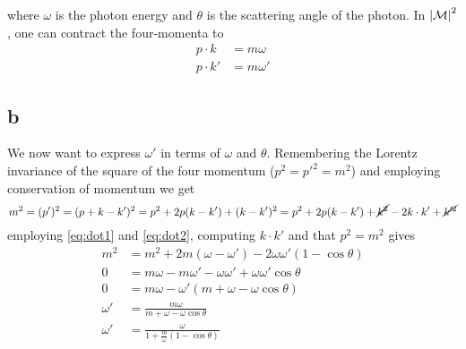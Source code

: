 \documentclass[11pt, a4paper]{amsart}
\begin{document}
where $\omega$ is the photon energy and $\theta$ is the scattering angle of the photon. In $\abs{\mathcal{M}}^2$, one can contract the four-momenta to
\begin{align}
p \cdot k \   &= m \omega \label{eq:dot1}\\
p \cdot k' &= m \omega' \label{eq:dot2}
\end{align}

\subsection{b}
We now want to express $\omega'$ in terms of $\omega$ and $\theta$. Remembering the Lorentz invariance of the square of the four momentum ($p^2 = p'^2 = m^2$) and employing conservation of momentum we get
\begin{equation}
m^2 = (p')^2 = (p + k - k')^2 = p^2 + 2p(k-k') + (k -k')^2 = p^2 + 2p(k-k') + \cancel{k^2} - 2k\cdot k' + \cancel{k'^2}
\end{equation}
employing \autoref{eq:dot1} and \autoref{eq:dot2}, computing $k\cdot k'$ and that $p^2 = m^2$ gives
\begin{align}
  m^2 &= m^2 + 2m(\omega - \omega') - 2\omega\omega'(1 - \cos \theta) \nonumber \\
       0 &= m\omega -m\omega' - \omega\omega' + \omega\omega'\cos \theta \nonumber \\
       0 &=m\omega - \omega'(m + \omega - \omega\cos\theta) \nonumber \\
       \omega' &= \frac{m\omega}{m + \omega - \omega\cos\theta} \nonumber \\
       \omega' &= \frac{\omega}{1 + \frac{m}{\omega}(1-\cos\theta)}
\end{align}
\end{document}
